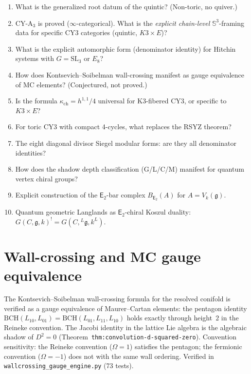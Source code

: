 \documentclass[11pt]{article}
\newcommand{\fg}{\mathfrak{g}}
\newcommand{\bS}{\mathbb{S}}
\newcommand{\Etwo}{\mathsf{E}_2}
\begin{document}
\begin{enumerate}
 \item What is the generalized root datum of the quintic? (Non-toric, no quiver.)
 \item CY-A$_3$ is proved ($\infty$-categorical). What is the \emph{explicit chain-level} $\bS^3$-framing data for specific CY3 categories (quintic, $K3 \times E$)?
 \item What is the explicit automorphic form (denominator identity) for Hitchin systems with $G = \mathrm{SL}_3$ or $E_8$?
 \item How does Kontsevich--Soibelman wall-crossing manifest as gauge equivalence of MC elements? (Conjectured, not proved.)
 \item Is the formula $\kappa_{\mathrm{ch}} = h^{1,1}/4$ universal for K3-fibered CY3, or specific to $K3 \times E$?
 \item For toric CY3 with compact 4-cycles, what replaces the RSYZ theorem?
 \item The eight diagonal divisor Siegel modular forms: are they all denominator identities?
 \item How does the shadow depth classification (G/L/C/M) manifest for quantum vertex chiral groups?
 \item Explicit construction of the $\Etwo$-bar complex $B_{\Etwo}(A)$ for $A = V_k(\fg)$.
 \item Quantum geometric Langlands as $\Etwo$-chiral Koszul duality: $G(C, \fg, k)^! = G(C, {}^L\fg, k^L)$.
\end{enumerate}

\section{Wall-crossing and MC gauge equivalence}
\label{wn:sec:wall-crossing-mc}

\begin{remark}
\label{rem:wall-crossing-mc-gauge}
The Kontsevich--Soibelman wall-crossing formula for the resolved conifold is verified as a gauge equivalence of Maurer--Cartan elements: the pentagon identity $\mathrm{BCH}(L_{10}, L_{01}) = \mathrm{BCH}(L_{01}, L_{11}, L_{10})$ holds exactly through height~$2$ in the Reineke convention. The Jacobi identity in the lattice Lie algebra is the algebraic shadow of $D^2 = 0$ (Theorem~\texttt{thm:convolution-d-squared-zero}). Convention sensitivity: the Reineke convention ($\Omega = 1$) satisfies the pentagon; the fermionic convention ($\Omega = -1$) does not with the same wall ordering. Verified in \texttt{wallcrossing\_gauge\_engine.py} (73 tests).
\end{remark}
\end{document}
